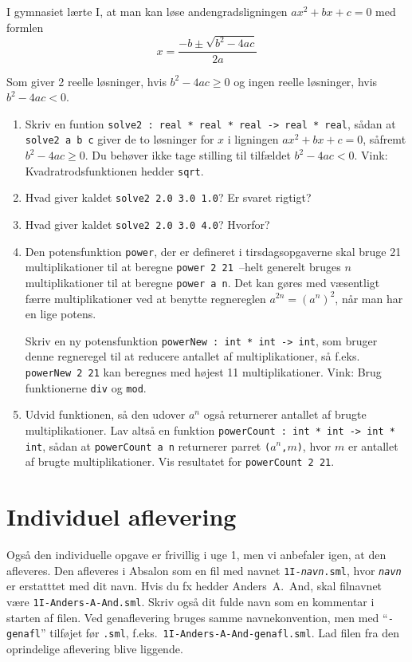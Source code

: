 \documentclass[a4paper,12pt]{article}
\begin{document}
I gymnasiet lærte I, at man kan løse andengradsligningen $ax^2 + bx +
c = 0$ med formlen
\[x = \frac{-b \pm \sqrt{b^2 - 4ac}}{2a}\]

Som giver 2 reelle løsninger, hvis $b^2 - 4ac \ge 0$ og ingen reelle
løsninger, hvis $b^2 - 4ac < 0$.

\begin{enumerate}[{1}G1]
\item Skriv en funtion %
  \verb|solve2 : real * real * real -> real * real|, sådan at\newline
  \verb|solve2 a b c| giver de to løsninger for $x$ i
  ligningen $ax^2 + bx + c = 0$, såfremt $b^2 - 4ac \ge 0$. Du behøver
  ikke tage stilling til tilfældet $b^2 - 4ac < 0$.  Vink:
  Kvadratrodsfunktionen hedder \verb|sqrt|.
\item Hvad giver kaldet \verb|solve2 2.0 3.0 1.0|? Er svaret rigtigt?
\item Hvad giver kaldet \verb|solve2 2.0 3.0 4.0|? Hvorfor?

\item Den potensfunktion \verb|power|, der er defineret i tirsdagsopgaverne
skal bruge 21 multiplikationer til at beregne \verb|power 2 21 |--helt
generelt bruges $n$ multiplikationer til at beregne
\verb|power a n|. Det kan gøres med væsentligt færre
multiplikationer ved at benytte regnereglen $a^{2n} = (a^n)^2$, når
man har en lige potens.

Skriv en ny potensfunktion \verb|powerNew : int * int -> int|, som
bruger denne regneregel til at reducere antallet af multiplikationer,
så f.eks. \verb|powerNew 2 21| kan beregnes med højest 11
multiplikationer. Vink: Brug funktionerne \verb|div| og \verb|mod|.

\item Udvid funktionen, så den udover $a^n$ også returnerer antallet
  af brugte multiplikationer. Lav altså en funktion %
  \verb|powerCount : int * int -> int * int|, sådan at
  \verb|powerCount a n| returnerer parret \texttt{($a^n$,$m$)},
  hvor $m$ er antallet af brugte multiplikationer. Vis resultatet for
  \verb|powerCount 2 21|.
\end{enumerate}

\section{Individuel aflevering}
\label{sec:indiv-aflev}

Også den individuelle opgave er frivillig i uge 1, men vi anbefaler
igen, at den afleveres. Den afleveres i Absalon som en fil med navnet
\texttt{1I-\textit{navn}.sml}, hvor \texttt{\textit{navn}} er
erstatttet med dit navn. Hvis du fx hedder Anders~A.~And, skal
filnavnet være \texttt{1I-Anders-A-And.sml}. Skriv også dit fulde navn
som en kommentar i starten af filen.  Ved genaflevering bruges samme
navnekonvention, men med ``\texttt{-genafl}'' tilføjet før
\texttt{.sml}, f.eks.\ \texttt{1I-Anders-A-And-genafl.sml}.  Lad filen
fra den oprindelige aflevering blive liggende.
\end{document}
